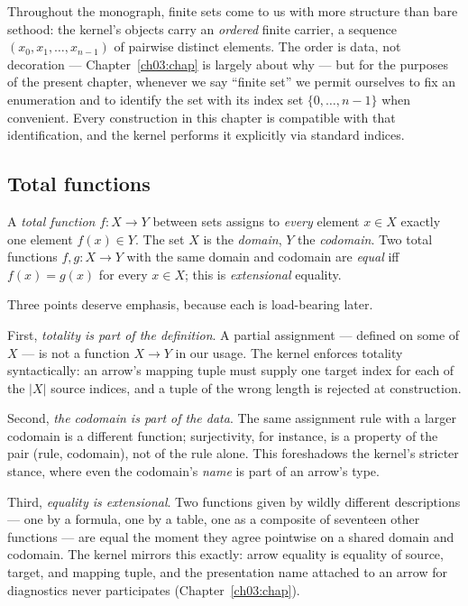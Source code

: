 Throughout the monograph, finite sets come to us with more structure than
bare sethood: the kernel's objects carry an \emph{ordered} finite carrier, a
sequence $(x_0, x_1, \dots, x_{n-1})$ of pairwise distinct elements. The
order is data, not decoration --- Chapter~\ref{ch03:chap} is largely about
why --- but for the purposes of the present chapter, whenever we say
``finite set'' we permit ourselves to fix an enumeration and to identify the
set with its index set $\{0, \dots, n-1\}$ when convenient. Every
construction in this chapter is compatible with that identification, and the
kernel performs it explicitly via standard indices.

\subsection{Total functions}

\begin{definition}\label{ch02:def:function}
A \emph{total function} $f : X \to Y$ between sets assigns to \emph{every}
element $x \in X$ exactly one element $f(x) \in Y$. The set $X$ is the
\emph{domain}, $Y$ the \emph{codomain}. Two total functions
$f, g : X \to Y$ with the same domain and codomain are \emph{equal} iff
$f(x) = g(x)$ for every $x \in X$; this is \emph{extensional} equality.
\end{definition}

Three points deserve emphasis, because each is load-bearing later.

First, \emph{totality is part of the definition}. A partial assignment ---
defined on some of $X$ --- is not a function $X \to Y$ in our usage. The
kernel enforces totality syntactically: an arrow's mapping tuple must supply
one target index for each of the $|X|$ source indices, and a tuple of the
wrong length is rejected at construction.

Second, \emph{the codomain is part of the data}. The same assignment rule
with a larger codomain is a different function; surjectivity, for instance,
is a property of the pair (rule, codomain), not of the rule alone. This
foreshadows the kernel's stricter stance, where even the codomain's
\emph{name} is part of an arrow's type.

Third, \emph{equality is extensional}. Two functions given by wildly
different descriptions --- one by a formula, one by a table, one as a
composite of seventeen other functions --- are equal the moment they agree
pointwise on a shared domain and codomain. The kernel mirrors this exactly:
arrow equality is equality of source, target, and mapping tuple, and the
presentation name attached to an arrow for diagnostics never participates
(Chapter~\ref{ch03:chap}).

